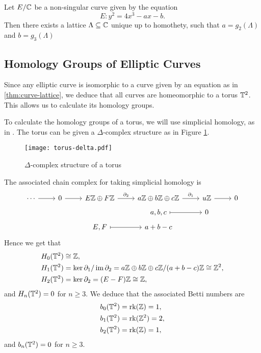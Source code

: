 \begin{theorem}
	\label{thm:curve-lattice}
	Let $E/\mathbb{C}$ be a non-singular curve given by the equation
	\begin{equation*}
		E: y^2 = 4x^3 - ax - b.
	\end{equation*} 
	Then there exists a lattice
	$\Lambda \subseteq \mathbb{C}$ unique up to homothety, such that
	$a = g_2(\Lambda)$ and $b = g_3(\Lambda)$
\end{theorem}

\subsection{Homology Groups of Elliptic Curves}

Since any elliptic curve is isomorphic to a curve given by an equation as in
\ref{thm:curve-lattice}, we deduce that all curves are homeomorphic
to a torus $\mathbb{T}^2$. This allows us to calculate its homology groups.

To calculate the homology groups of a torus, we will use simplicial homology,
as in \cite[\S2.1]{hatcher}. The torus can be given a $\Delta$-complex structure
as in Figure \ref{fig:torus-delta}.
\begin{figure}[h]
	\centering 
	\texttt{[image: torus-delta.pdf]}
	\caption[torus-delta]{$\Delta$-complex structure of a torus}
	\label{fig:torus-delta}
\end{figure}

The associated chain complex for taking simplicial homology is 
\begin{equation*}
	\begin{tikzcd}[row sep=tiny]
	\cdots & 0 & {E\Z \oplus F\Z} & {a\Z\oplus b\Z\oplus c\Z} & u\Z & 0 \\
	&&& {a,b,c} & 0 \\
	&& {E,F} & {a +b-c}
	\arrow["\partial_1", from=1-4, to=1-5]
	\arrow["\partial_2", from=1-3, to=1-4]
	\arrow[from=1-5, to=1-6]
	\arrow[from=1-2, to=1-3]
	\arrow[from=1-1, to=1-2]
	\arrow[maps to, from=3-3, to=3-4]
	\arrow[maps to, from=2-4, to=2-5]
\end{tikzcd}
\end{equation*}
Hence we get that
\begin{align*}
	H_0(\mathbb{T}^2) &\cong \mathbb{Z},\\
	H_1(\mathbb{T}^2) &= \ker \partial_1 / \operatorname{im} \partial_2
	= a\mathbb{Z} \oplus b\mathbb{Z} \oplus c\mathbb{Z} / (a + b - c)\mathbb{Z} \cong \mathbb{Z}^2,\\
	H_2(\mathbb{T}^2) &= \ker \partial_2 = (E-F)\mathbb{Z} \cong \mathbb{Z},
\end{align*}
and $H_n(\mathbb{T}^2) = 0$ for $n \geq 3$.
We deduce that the associated Betti numbers are
\begin{align*}
	b_0(\mathbb{T}^2) &= \operatorname{rk}(\mathbb{Z}) = 1,\\
	b_1(\mathbb{T}^2) &= \operatorname{rk}(\mathbb{Z}^2) = 2,\\
	b_2(\mathbb{T}^2) &= \operatorname{rk}(\mathbb{Z}) = 1,
\end{align*}
and $b_n(\mathbb{T}^2) = 0$ for $n \geq 3$.

